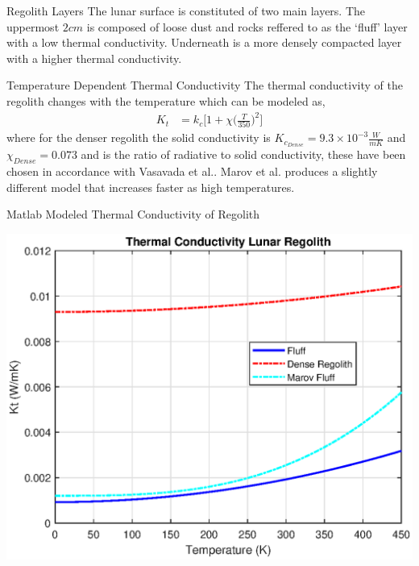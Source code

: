 \documentclass{beamer}
\begin{document}
\begin{frame}{Regolith Layers}
The lunar surface is constituted of two main layers. The uppermost $2cm$ is composed of loose dust and rocks reffered to as the `fluff' layer with a low thermal conductivity. Underneath is a more densely compacted layer with a higher thermal conductivity\cite{Malla}.
\end{frame}


\begin{frame}{Temperature Dependent Thermal Conductivity}
The thermal conductivity of the regolith changes with the temperature which can be modeled as,
\begin{align*}
K_t & = k_c \Bigg [ 1+\chi \bigg ( \frac{T}{350} \bigg )^2  \bigg ]
\end{align*}
where for the denser regolith the solid conductivity is $K_{c_{Dense}} = 9.3\times 10^{-3} \frac{W}{mK}$ and $\chi_{Dense}= 0.073$ and is the ratio of radiative to solid conductivity, these have been chosen in accordance with Vasavada et al.\cite{Vasavada}. Marov et al. produces a slightly different model that increases faster as high temperatures.
\end{frame}

\begin{frame}{Matlab Modeled Thermal Conductivity of Regolith}
 \begin{center}
             \includegraphics[width=.9\textwidth]{thermal_conductivity.eps}   
      \end{center}  

\end{frame}
\end{document}
